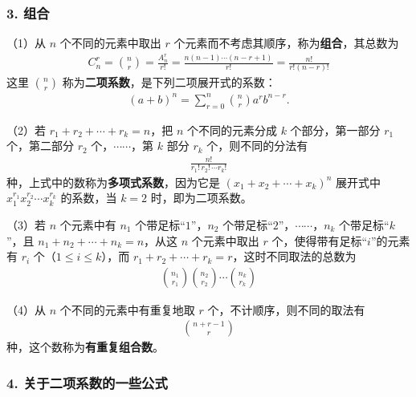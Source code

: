 \documentclass[../../main.tex]{subfiles}
\begin{document}
\subsubsection*{3. 组合}

（1）从 $n$ 个不同的元素中取出 $r$ 个元素而不考虑其顺序，称为\textbf{组合}，其总数为
\begin{align*}
C_n^r=\binom{n}{r}=\frac{A_n^r}{r!}=\frac{n(n-1)\cdots(n-r+1)}{r!}=\frac{n!}{r!(n-r)!}
\end{align*}
这里 $\binom{n}{r}$ 称为\textbf{二项系数}，是下列二项展开式的系数：
\begin{align*}
(a+b)^n=\sum_{r=0}^{n}\binom{n}{r}a^r b^{n-r}.
\end{align*}

（2）若 $r_1+r_2+\cdots+r_k=n$，把 $n$ 个不同的元素分成 $k$ 个部分，第一部分 $r_1$ 个，第二部分 $r_2$ 个，$\cdots\cdots$，第 $k$ 部分 $r_k$ 个，则不同的分法有
\begin{align}
\frac{n!}{r_1!\,r_2!\,\cdots r_k!}\label{align:ch01-多项式系数}
\end{align}
种，上式中的数称为\textbf{多项式系数}，因为它是 $(x_1+x_2+\cdots+x_k)^n$ 展开式中 $x_1^{r_1}x_2^{r_2}\cdots x_k^{r_k}$ 的系数，当 $k=2$ 时，即为二项系数。

（3）若 $n$ 个元素中有 $n_1$ 个带足标“$1$”，$n_2$ 个带足标“$2$”，$\cdots\cdots$，$n_k$ 个带足标“$k$”，且 $n_1+n_2+\cdots+n_k=n$，从这 $n$ 个元素中取出 $r$ 个，使得带有足标“$i$”的元素有 $r_i$ 个（$1\leqslant i\leqslant k$），而 $r_1+r_2+\cdots+r_k=r$，这时不同取法的总数为
\begin{align}
\binom{n_1}{r_1}\binom{n_2}{r_2}\cdots\binom{n_k}{r_k}\label{align:ch01-分类组合}
\end{align}

（4）从 $n$ 个不同的元素中有重复地取 $r$ 个，不计顺序，则不同的取法有
\begin{align*}
\binom{n+r-1}{r}
\end{align*}
种，这个数称为\textbf{有重复组合数}。

\subsubsection*{4. 关于二项系数的一些公式}
\end{document}
